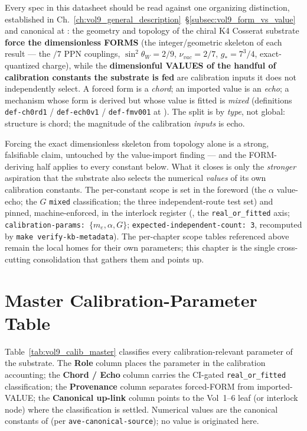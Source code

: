 Every spec in this datasheet should be read against one organizing distinction, established in Ch.~\ref{ch:vol9_general_description}~\S\ref{subsec:vol9_form_vs_value} and canonical at : the geometry and topology of the chiral K4 Cosserat substrate \textbf{force the dimensionless FORMS} (the integer/geometric skeleton of each result --- the $/7$ PPN couplings, $\sin^2\theta_W = 2/9$, $\nu_{vac} = 2/7$, $g_* = 7^3/4$, exact-quantized charge), while the \textbf{dimensionful VALUES of the handful of calibration constants the substrate is fed} are calibration inputs it does not independently select. A forced form is a \emph{chord}; an imported value is an \emph{echo}; a mechanism whose form is derived but whose value is fitted is \emph{mixed} (definitions \texttt{def-ch0rd1} / \texttt{def-ech0v1} / \texttt{def-fmv001} at ). The split is by \emph{type}, not global: structure is chord; the magnitude of the calibration \emph{inputs} is echo.

Forcing the exact dimensionless skeleton from topology alone is a strong, falsifiable claim, untouched by the value-import finding --- and the FORM-deriving half applies to every constant below. What it closes is only the \emph{stronger} aspiration that the substrate also selects the numerical \emph{values} of its own calibration constants. The per-constant scope is set in the foreword (the $\alpha$ value-echo; the $G$ \texttt{mixed} classification; the three independent-route test set) and pinned, machine-enforced, in the interlock register (, the \texttt{real\_or\_fitted} axis; \texttt{calibration-params:}~$\{m_e, \alpha, G\}$; \texttt{expected-independent-count:~3}, recomputed by \texttt{make verify-kb-metadata}). The per-chapter scope tables referenced above remain the local homes for their own parameters; this chapter is the single cross-cutting consolidation that gathers them and points up.

\section{Master Calibration-Parameter Table}
\label{sec:vol9_calib_master_table}

Table~\ref{tab:vol9_calib_master} classifies every calibration-relevant parameter of the substrate. The \textbf{Role} column places the parameter in the calibration accounting; the \textbf{Chord / Echo} column carries the CI-gated \texttt{real\_or\_fitted} classification; the \textbf{Provenance} column separates forced-FORM from imported-VALUE; the \textbf{Canonical up-link} column points to the Vol~1--6 leaf (or interlock node) where the classification is settled. Numerical values are the canonical constants of  (per \texttt{ave-canonical-source}); no value is originated here.

